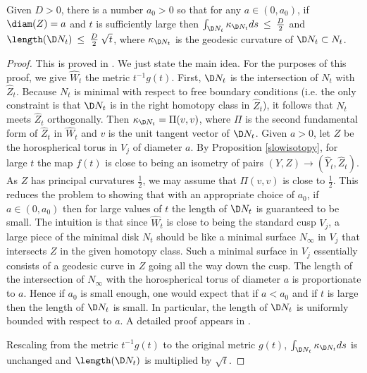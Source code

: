 \begin{lemma}
  \label{lem:kl-incompressibility-cuspidal-tori-existence-kappa-solutions}
 \label{Hamlemma}
Given $D > 0$, there is a number $a_0 > 0$
so that for any $a \in (0,a_0)$, if $\diam(Z) = a$ and $t$ is
sufficiently large then
$\int_{\D N_t}\kappa_{\D N_t}ds \: \le \: \frac{D}{2}$ and
$\length(\D N_t) \: \le \: \frac{D}{2} \: \sqrt{t}$,
where $\kappa_{\D N_t}$ is the geodesic curvature of
$\D N_t \subset N_t$.
\end{lemma}
\begin{proof}
This is proved in \cite[Sections 11 and 12]{Hamiltonn}. We just state the
main idea.  For the purposes of this proof, we give $\hat W_t$ the
metric $t^{-1} g(t)$. First,  $\D N_t$ is the intersection of $N_t$ with
$\hat Z_t$. Because $N_t$ is minimal with respect to free boundary
conditions (i.e. the only constraint is that $\D N_t$ is in the
right homotopy class in $\hat Z_t$), it follows that $N_t$ meets
$\hat Z_t$ orthogonally. Then $\kappa_{\D N_t} =
\Pi(v,v)$, where $\Pi$ is the second fundamental form of
$\hat Z_t$ in $\hat W_t$ and $v$ is the unit tangent vector of $\D N_t$.
Given $a>0$, let $Z$ be the horospherical torus
in $V_j$ of diameter
$a$.
By Proposition \ref{slowisotopy},
for large $t$ the map $f(t)$ is close to being an isometry of pairs
$(Y, Z) \rightarrow (\hat Y_t, \hat Z_t)$.
As $Z$ has principal
curvatures $\frac12$, we may assume that
$\Pi(v,v)$ is close to $\frac12$. This reduces the problem to showing that
with an appropriate choice of $a_0$, if $a \in (0, a_0)$ then
for large values of $t$ the length of
$\D N_t$ is guaranteed to be small. The intuition is that since
$\hat W_t$ is close to being the standard cusp $V_j$, a large piece of
the minimal disk
$N_t$ should be like a minimal surface $N_\infty$  in $V_j$
that intersects $Z$ in the given homotopy class.  Such a minimal
surface in $V_j$ essentially consists of a
geodesic curve in $Z$ going all the way down the cusp. The
length of the intersection of $N_\infty$ with the horospherical
torus of diameter $a$ is proportionate to $a$.  Hence if $a_0$ is small enough, one
would expect that if $a < a_0$ and if $t$ is large then
the length of $\D N_t$ is small.
In particular, the length of $\D N_t$ is uniformly bounded with
respect to $a$.
 A detailed proof appears in
\cite[Section 12]{Hamiltonn}.

Rescaling from the metric $t^{-1} g(t)$ to the original metric $g(t)$,
$\int_{\D N_t}\kappa_{\D N_t}ds$ is unchanged and
$\length(\D N_t)$ is multiplied by $\sqrt{t}$.
\end{proof}

